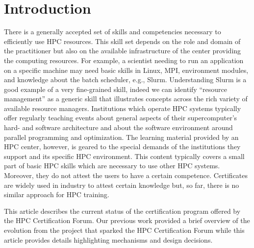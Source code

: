 \documentclass[jocse]{jocseart}
\begin{document}
%
%
\begin{CCSXML}
\end{CCSXML}



\keywords{}

\maketitle

\section{Introduction}

There is a generally accepted set of skills and competencies necessary to efficiently use HPC resources.
This skill set depends on the role and domain of the practitioner but also on the available infrastructure of the center providing the computing resources.
For example, a scientist needing to run an application on a specific machine may need basic skills in Linux, MPI, environment modules, and knowledge about the batch scheduler, e.g., Slurm.
Understanding Slurm is a good example of a very fine-grained skill, indeed we can identify “resource management” as a generic skill that illustrates concepts across the rich variety of available resource managers.
Institutions which operate HPC systems typically offer regularly teaching events about general aspects of their supercomputer's hard- and software architecture and about the software environment around parallel programming and optimization.
The learning material provided by an HPC center, however, is geared to the special demands of the institutions they support and its specific HPC environment.
This content typically covers a small part of basic HPC skills which are necessary to use other HPC systems.
Moreover, they do not attest the users to have a certain competence.
Certificates are widely used in industry to attest certain knowledge but, so far, there is no similar approach for HPC training.

This article describes the current status of the certification program offered by the HPC Certification Forum.
Our previous work provided a brief overview of the evolution from the project that sparked  the HPC Certification Forum \cite{TAHCPKHHSS19} while this article provides details highlighting mechanisms and design decisions.
\end{document}
